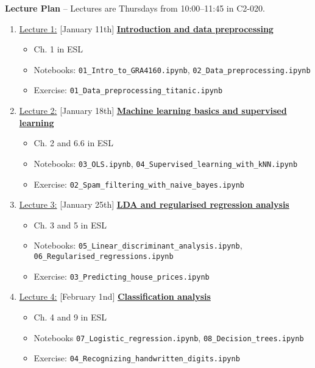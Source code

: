 \documentclass[12pt, a4paper]{article}
\begin{document}
\newpage
\noindent\textbf{\large Lecture Plan}
 -- Lectures are Thursdays from 10:00--11:45 in C2-020. \\
\begin{enumerate}
  \item[] \underline{Lecture 1:} [January 11th] \underline{\bf Introduction and data preprocessing}
     {\small
         \begin{itemize}
             \item Ch. 1 in ESL
             \item Notebooks: \texttt{01\_Intro\_to\_GRA4160.ipynb}, \texttt{02\_Data\_preprocessing.ipynb}
             \item Exercise: \texttt{01\_Data\_preprocessing\_titanic.ipynb}
         \end{itemize}
     }
  \item[] \underline{Lecture 2:} [January 18th] \underline{\bf Machine learning basics and supervised learning}
    {\small
          \begin{itemize}
                \item Ch. 2 and 6.6 in ESL
                \item Notebooks: \texttt{03\_OLS.ipynb}, \texttt{04\_Supervised\_learning\_with\_kNN.ipynb}
                \item Exercise: \texttt{02\_Spam\_filtering\_with\_naive\_bayes.ipynb}
          \end{itemize}
    }
  \item[] \underline{Lecture 3:} [January 25th] \underline{\bf LDA and regularised regression analysis}
    {\small
          \begin{itemize}
              \item Ch. 3 and 5 in ESL
              \item Notebooks: \texttt{05\_Linear\_discriminant\_analysis.ipynb}, \texttt{06\_Regularised\_regressions.ipynb}
              \item Exercise: \texttt{03\_Predicting\_house\_prices.ipynb}
          \end{itemize}
    }
  \item [] \underline{Lecture 4:} [February 1nd] \underline{\bf Classification analysis}
    {\small
            \begin{itemize}
                \item Ch. 4 and 9 in ESL
                \item Notebooks \texttt{07\_Logistic\_regression.ipynb}, \texttt{08\_Decision\_trees.ipynb}
                \item Exercise: \texttt{04\_Recognizing\_handwritten\_digits.ipynb}

\end{itemize}}
\end{enumerate}
\end{document}
